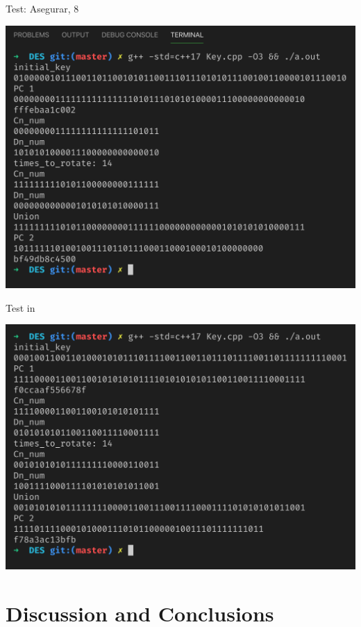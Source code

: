 \documentclass[fleqn, journal, onecolumn]{IEEEtran}             %
\theoremstyle{break}                                            %
\begin{document}
  Test: Asegurar, 8 \\
  \begin{minipage}{.7\textwidth}
    \includegraphics[width=\linewidth]{1}
  \end{minipage}

  Test in \cite{page} \\
  \begin{minipage}{.7\textwidth}
    \includegraphics[width=\linewidth]{OTHER}
  \end{minipage}

  \section{Discussion and Conclusions}
\end{document}
